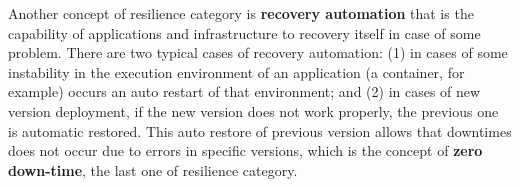Another concept of resilience category is \textbf{recovery automation} that is
the capability of applications and infrastructure to recovery itself in case of
some problem. There are two typical cases of recovery automation: (1) in cases
of some instability in the execution environment of an application (a
container, for example) occurs an auto restart of that environment; and (2) in
cases of new version deployment, if the new version does not work properly, the
previous one is automatic restored. This auto restore of previous version
allows that downtimes does not occur due to errors in specific versions, which
is the concept of \textbf{zero down-time}, the last one of resilience category.
